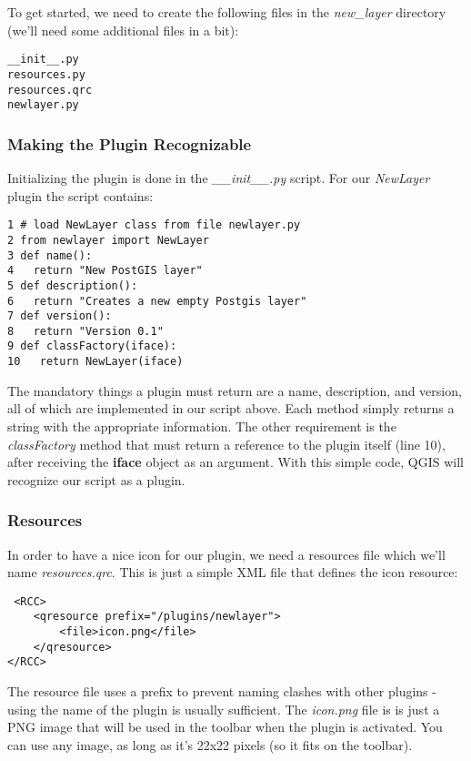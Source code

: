 To get started, we need to create the following files in the \textsl{new\_layer} directory
  (we'll need some additional files in a bit):

\begin{verbatim}
__init__.py 
resources.py
resources.qrc
newlayer.py
\end{verbatim} 

\subsubsection{Making the Plugin Recognizable}

Initializing the plugin is done in the \textsl{\_\_init\_\_.py} script. For our 
\textsl{NewLayer} plugin the script contains:

\begin{verbatim}
1 # load NewLayer class from file newlayer.py
2 from newlayer import NewLayer
3 def name():
4   return "New PostGIS layer"
5 def description():
6   return "Creates a new empty Postgis layer"
7 def version():
8   return "Version 0.1"
9 def classFactory(iface):
10   return NewLayer(iface)
\end{verbatim} 

The mandatory things a plugin must return are a name, description, and
version, all of which are implemented in our script above. Each method
simply returns a string with the appropriate information. The other
requirement is the \textsl{classFactory} method that must
return a reference to the plugin itself (line 10), after 
receiving the \textbf{iface} object as an argument. With this simple code, 
QGIS will recognize our script as a plugin.

\subsubsection{Resources}

In order to have a nice icon for our plugin, we need a resources file
which we'll name \textsl{resources.qrc}. This is just a simple XML 
file that defines the icon resource:

\begin{verbatim}
 <RCC>
    <qresource prefix="/plugins/newlayer">
        <file>icon.png</file>
    </qresource>
</RCC> 
\end{verbatim} 

The resource file uses a prefix to prevent naming clashes with other
plugins - using the name of the plugin is usually sufficient.
The \textsl{icon.png} file is is just a PNG image that will be used 
in the toolbar when the plugin is activated. You can use any image, 
as long as it's 22x22 pixels (so it fits on the toolbar).

